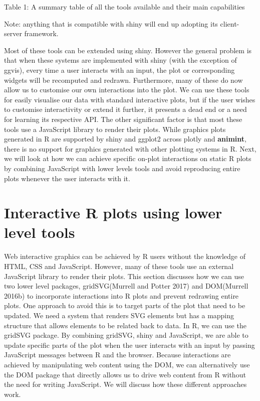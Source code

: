\documentclass[11pt,]{report}
\begin{document}
Table 1: A summary table of all the tools available and their main
capabilities

Note: anything that is compatible with shiny will end up adopting its
client-server framework.

Most of these tools can be extended using shiny. However the general
problem is that when these systems are implemented with shiny (with the
exception of ggvis), every time a user interacts with an input, the plot
or corresponding widgets will be recomputed and redrawn. Furthermore,
many of these do now allow us to customise our own interactions into the
plot. We can use these tools for easily visualise our data with standard
interactive plots, but if the user wishes to customise interactivity or
extend it further, it presents a dead end or a need for learning its
respective API. The other significant factor is that most these tools
use a JavaScript library to render their plots. While graphics plots
generated in R are supported by \textsf{shiny} and ggplot2 across
\textsf{plotly} and \textbf{animint}, there is no support for graphics
generated with other plotting systems in R. Next, we will look at how we
can achieve specific on-plot interactions on static R plots by combining
JavaScript with lower levels tools and avoid reproducing entire plots
whenever the user interacts with it.

\newpage

\chapter{Interactive R plots using lower level
tools}\label{interactive-r-plots-using-lower-level-tools}

Web interactive graphics can be achieved by R users without the
knowledge of HTML, CSS and JavaScript. However, many of these tools use
an external JavaScript library to render their plots. This section
discusses how we can use two lower level packages,
\textsf{gridSVG}(Murrell and Potter 2017) and \textsf{DOM}(Murrell
2016b) to incorporate interactions into R plots and prevent redrawing
entire plots. One approach to avoid this is to target parts of the plot
that need to be updated. We need a system that renders SVG elements but
has a mapping structure that allows elements to be related back to data.
In R, we can use the \textsf{gridSVG} package. By combining
\textsf{gridSVG}, \textsf{shiny} and JavaScript, we are able to update
specific parts of the plot when the user interacts with an input by
passing JavaScript messages between R and the browser. Because
interactions are achieved by manipulating web content using the
\textsf{DOM}, we can alternatively use the \textsf{DOM} package that
directly allows us to drive web content from R without the need for
writing JavaScript. We will discuss how these different approaches work.
\end{document}
